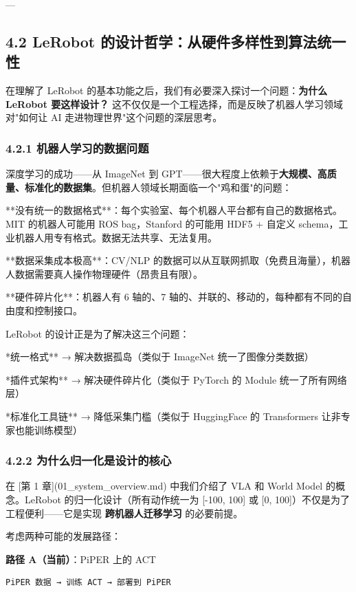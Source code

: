 \documentclass[UTF8,a4paper,11pt]{ctexart}
\begin{document}
---

\subsection{4.2 LeRobot 的设计哲学：从硬件多样性到算法统一性}

在理解了 LeRobot 的基本功能之后，我们有必要深入探讨一个问题：\textbf{为什么 LeRobot 要这样设计？} 这不仅仅是一个工程选择，而是反映了机器人学习领域对"如何让 AI 走进物理世界"这个问题的深层思考。

\subsubsection{4.2.1 机器人学习的数据问题}

深度学习的成功——从 ImageNet 到 GPT——很大程度上依赖于\textbf{大规模、高质量、标准化的数据集}。但机器人领域长期面临一个"鸡和蛋"的问题：

\item[1] **没有统一的数据格式**：每个实验室、每个机器人平台都有自己的数据格式。MIT 的机器人可能用 ROS bag，Stanford 的可能用 HDF5 + 自定义 schema，工业机器人用专有格式。数据无法共享、无法复用。
\item[2] **数据采集成本极高**：CV/NLP 的数据可以从互联网抓取（免费且海量），机器人数据需要真人操作物理硬件（昂贵且有限）。
\item[3] **硬件碎片化**：机器人有 6 轴的、7 轴的、并联的、移动的，每种都有不同的自由度和控制接口。

LeRobot 的设计正是为了解决这三个问题：
\item **统一格式** → 解决数据孤岛（类似于 ImageNet 统一了图像分类数据）
\item **插件式架构** → 解决硬件碎片化（类似于 PyTorch 的 Module 统一了所有网络层）
\item **标准化工具链** → 降低采集门槛（类似于 HuggingFace 的 Transformers 让非专家也能训练模型）

\subsubsection{4.2.2 为什么归一化是设计的核心}

在 [第 1 章](01_system_overview.md) 中我们介绍了 VLA 和 World Model 的概念。LeRobot 的归一化设计（所有动作统一为 [-100, 100] 或 [0, 100]）不仅是为了工程便利——它是实现 \textbf{跨机器人迁移学习} 的必要前提。

考虑两种可能的发展路径：

\textbf{路径 A（当前）}：PiPER 上的 ACT
\begin{lstlisting}[language=text]
PiPER 数据 → 训练 ACT → 部署到 PiPER
\end{lstlisting}
\end{document}
